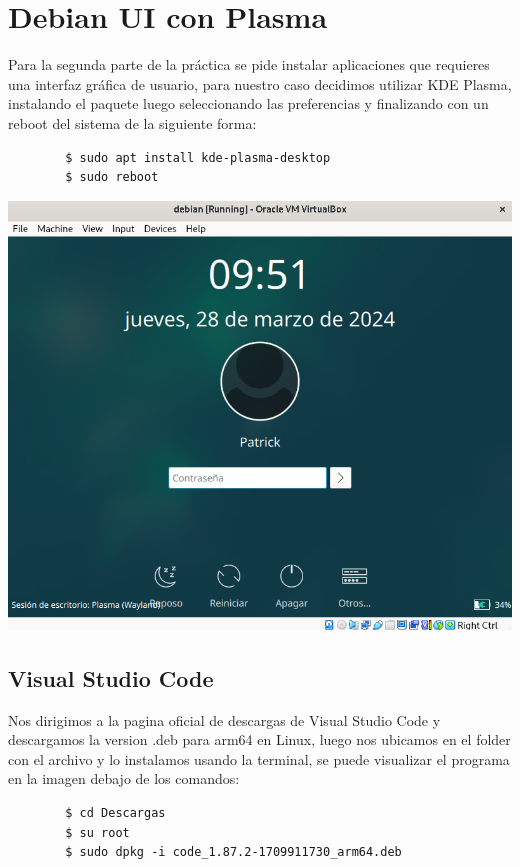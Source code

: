 \documentclass{article}
\begin{document}
\section{Debian UI con Plasma}
Para la segunda parte de la práctica se pide instalar aplicaciones que requieres una interfaz gráfica de usuario, para nuestro caso decidimos utilizar KDE Plasma, instalando el paquete luego seleccionando las preferencias y finalizando con un reboot del sistema de la siguiente forma:
    \begin{verbatim}
        $ sudo apt install kde-plasma-desktop
        $ sudo reboot
    \end{verbatim}

\includegraphics[scale=0.5]{capturas_debian/Plasma.png}  
    \subsection{Visual Studio Code}
    Nos dirigimos a la pagina oficial de descargas de Visual Studio Code y descargamos la version .deb para arm64 en Linux, luego nos ubicamos en el folder con el archivo y lo instalamos usando la terminal, se puede visualizar el programa en la imagen debajo de los comandos:
    \begin{verbatim}
        $ cd Descargas
        $ su root
        $ sudo dpkg -i code_1.87.2-1709911730_arm64.deb
    \end{verbatim}
\end{document}
